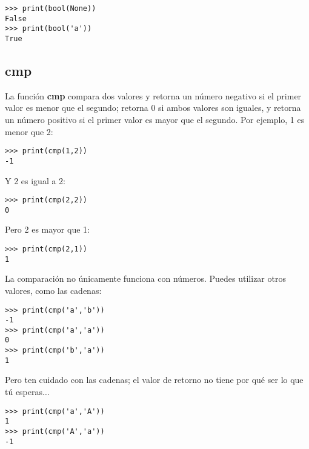 \begin{listing}
\begin{verbatim}
>>> print(bool(None))
False
>>> print(bool('a'))
True 
\end{verbatim}
\end{listing}

\subsection*{cmp}

La función \textbf{cmp} compara dos valores y retorna un número negativo si el primer valor es menor que el segundo; retorna 0 si ambos valores son iguales, y retorna un número positivo si el primer valor es mayor que el segundo.   Por ejemplo, 1 es menor que 2:

\begin{listing}
\begin{verbatim}
>>> print(cmp(1,2))
-1
\end{verbatim}
\end{listing}

\noindent
Y 2 es igual a 2:

\begin{listing}
\begin{verbatim}
>>> print(cmp(2,2))
0
\end{verbatim}
\end{listing}

\noindent
Pero 2 es mayor que 1:

\begin{listing}
\begin{verbatim}
>>> print(cmp(2,1))
1
\end{verbatim}
\end{listing}

\noindent
La comparación no únicamente funciona con números.   Puedes utilizar otros valores, como las cadenas:

\begin{listing}
\begin{verbatim}
>>> print(cmp('a','b'))
-1
>>> print(cmp('a','a'))
0
>>> print(cmp('b','a'))
1
\end{verbatim}
\end{listing}

\noindent
Pero ten cuidado con las cadenas; el valor de retorno no tiene por qué ser lo que tú esperas$\ldots$

\begin{listing}
\begin{verbatim}
>>> print(cmp('a','A'))
1
>>> print(cmp('A','a'))
-1
\end{verbatim}
\end{listing}

